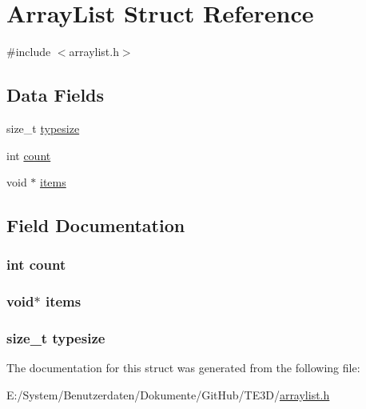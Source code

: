 \hypertarget{struct_array_list}{\section{Array\-List Struct Reference}
\label{struct_array_list}
}


{\ttfamily \#include $<$arraylist.\-h$>$}

\subsection*{Data Fields}
\begin{DoxyCompactItemize}
\item 
size\-\_\-t \hyperlink{struct_array_list_aae15b6d77b58dbd6f21861d1320ec961}{typesize}
\item 
int \hyperlink{struct_array_list_ad43c3812e6d13e0518d9f8b8f463ffcf}{count}
\item 
void $\ast$ \hyperlink{struct_array_list_aaf3a7f7e06149edc000a4a62ca99ec18}{items}
\end{DoxyCompactItemize}


\subsection{Field Documentation}
\hypertarget{struct_array_list_ad43c3812e6d13e0518d9f8b8f463ffcf}{
\subsubsection[{count}]{\setlength{\rightskip}{0pt plus 5cm}int count}}\label{struct_array_list_ad43c3812e6d13e0518d9f8b8f463ffcf}
\hypertarget{struct_array_list_aaf3a7f7e06149edc000a4a62ca99ec18}{
\subsubsection[{items}]{\setlength{\rightskip}{0pt plus 5cm}void$\ast$ items}}\label{struct_array_list_aaf3a7f7e06149edc000a4a62ca99ec18}
\hypertarget{struct_array_list_aae15b6d77b58dbd6f21861d1320ec961}{
\subsubsection[{typesize}]{\setlength{\rightskip}{0pt plus 5cm}size\-\_\-t typesize}}\label{struct_array_list_aae15b6d77b58dbd6f21861d1320ec961}


The documentation for this struct was generated from the following file\-:\begin{DoxyCompactItemize}
\item 
E\-:/\-System/\-Benutzerdaten/\-Dokumente/\-Git\-Hub/\-T\-E3\-D/\hyperlink{arraylist_8h}{arraylist.\-h}\end{DoxyCompactItemize}

